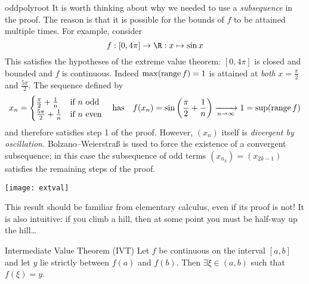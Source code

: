 
\begin{example}{}{oddpolyroot}
	It is worth thinking about why we needed to use a \emph{subsequence} in the proof. The reason is that it is possible for the bounds of $f$ to be attained multiple times. For example, consider
	\[
		f:[0,4\pi]\to\R:x\mapsto \sin x
	\]
	This satisfies the hypotheses of the extreme value theorem: $[0,4\pi]$ is closed and bounded and $f$ is continuous. Indeed $\max(\operatorname{range} f)=1$ is attained at \emph{both} $x=\frac\pi 2$ and $\frac{5\pi}2$. The sequence defined by
	\[
		x_n=
		\begin{cases}
			\frac\pi 2+\frac 1n&\text{if $n$ odd}\\
			\frac{5\pi}2+\frac 1n&\text{if $n$ even}
		\end{cases}\quad\text{has}\quad f(x_n)=\sin\left(\frac\pi 2+\frac 1n\right)\xrightarrow[n\to\infty]{} 1 =\sup(\operatorname{range} f)
	\]
	and therefore satisfies step 1 of the proof. However, $(x_n)$ itself is \emph{divergent by oscillation.} Bolzano--Weierstraß is used to force the existence of a convergent subsequence; in this case the subsequence of odd terms $(x_{n_k})=(x_{2k-1})$ satisfies the remaining steps of the proof.
	\begin{center}
		\texttt{[image: extval]}
	\end{center}
\end{example}

\goodbreak



This result should be familiar from elementary calculus, even if its proof is not! It is also intuitive: if you climb a hill, then at some point you must be half-way up the hill\ldots


\begin{thm}{Intermediate Value Theorem (IVT)}{}
	Let $f$ be continuous on the interval $[a,b]$ and let $y$ lie strictly between $f(a)$ and $f(b)$. Then $\exists\xi\in(a,b)$ such that $f(\xi)=y$.
\end{thm}



